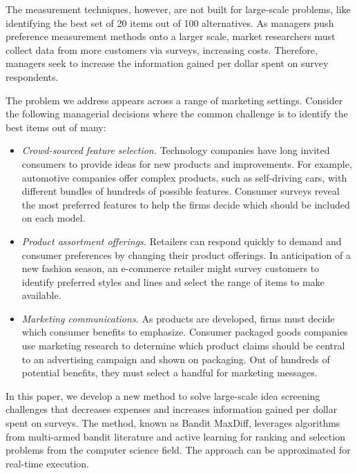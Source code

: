 \documentclass[nonblindrev]{informs3}
\begin{document}
The measurement techniques, however, are not built for large-scale problems, like identifying the best set of 20 items out of 100 alternatives. As managers push preference measurement methods onto a larger scale, market researchers must collect data from more customers via surveys, increasing costs. Therefore, managers seek to increase the information gained per dollar spent on survey respondents. 

The problem we address appears across a range of marketing settings. Consider the following managerial decisions where the common challenge is to identify the best items out of many:

\begin{itemize}
	\item \emph{Crowd-sourced feature selection.} Technology companies have long invited consumers to provide ideas for new products and improvements. For example, automotive companies offer complex products, such as self-driving cars, with different bundles of hundreds of possible features. Consumer surveys reveal the most preferred features to help the firms decide which should be included on each model.
	\item \emph{Product assortment offerings.} Retailers can respond quickly to demand and consumer preferences by changing their product offerings. In anticipation of a new fashion season, an e-commerce retailer might survey customers to identify preferred styles and lines and select the range of items to make available.
	\item \emph{Marketing communications.} As products are developed, firms must decide which consumer benefits to emphasize. Consumer packaged goods companies use marketing research to determine which product claims should be central to an advertising campaign and shown on packaging. Out of hundreds of potential benefits, they must select a handful for marketing messages.
\end{itemize}

In this paper, we develop a new method to solve large-scale idea screening challenges that decreases expenses and increases information gained per dollar spent on surveys. The method, known as Bandit MaxDiff, leverages algorithms from multi-armed bandit literature and active learning for ranking and selection problems from the computer science field. The approach can be approximated for real-time execution.
\end{document}
